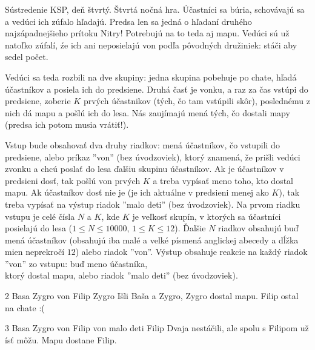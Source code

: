 



Sústredenie KSP, deň štvrtý. Štvrtá nočná hra. Účastníci sa búria, schovávajú 
sa a vedúci ich zúfalo hľadajú. Predsa len sa jedná o hľadaní druhého 
najzápadnejšieho prítoku Nitry! Potrebujú na to teda aj mapu. Vedúci sú už 
natoľko zúfalí, źe ich ani neposielajú von podľa pôvodných družiniek: stáči 
aby sedel počet.

Vedúci sa teda rozbili na dve skupiny: jedna skupina pobehuje po chate, hľadá 
účastníkov a posiela ich do predsiene. Druhá časť je vonku, a raz za čas 
vstúpi do predsiene, zoberie $K$ prvých účastnikov (tých, čo tam vstúpili 
skôr), poslednému z nich dá mapu a pošlú ich do lesa. Nás zaujímajú mená tých, 
čo dostali mapy (predsa ich potom musia vrátiť!).

Vstup bude obsahovať dva druhy riadkov: mená účastníkov, čo vstupili do 
predsiene, alebo príkaz ''von'' (bez úvodzoviek), ktorý znamená, že prišli 
vedúci zvonku a chcú poslať do lesa ďalšiu skupinu účastníkov. Ak je 
účastníkov v predsieni dosť, tak pošlú von prvých $K$ a treba vypísať meno 
toho, kto dostal mapu. Ak účastníkov dosť nie je (je ich aktuálne v predsieni 
menej ako $K$), tak treba vypísať na výstup riadok ''malo deti'' (bez 
úvodzoviek).
Na prvom riadku vstupu je celé čísla $N$ a $K$, kde $K$ je veľkosť skupín, v 
ktorých sa účastníci posielajú do lesa ($1 \leq N \leq 10000$, $1 \leq K 
\leq 12$). Ďalšie $N$ riadkov obsahujú buď mená účastníkov (obsahujú iba malé 
a velké písmená anglickej abecedy a dĺžka mien neprekročí $12$) alebo riadok 
''von''.
Výstup obsahuje reakcie na každý riadok ''von'' zo vstupu: buď meno účastníka, \\
ktorý dostal mapu, alebo riadok ''malo deti'' (bez úvodzoviek).

 2
Basa
Zygro
von
Filip
\vystup
Zygro
\komentar
Išli Baša a Zygro, Zygro dostal mapu.
Filip ostal na chate :(
\koniec

 3
Basa
Zygro
von
Filip
von
\vystup
malo deti
Filip
\komentar
Dvaja nestáčili, ale spolu s Filipom už ísť môžu. Mapu dostane Filip.
\koniec


